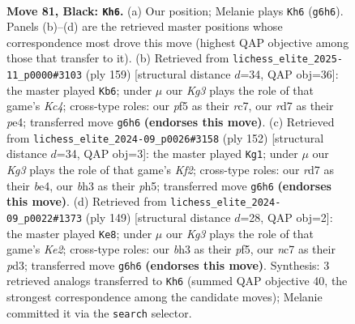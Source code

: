 \documentclass[11pt]{article}
\begin{document}
\clearpage

\begin{figure}[p]\centering
\begin{subfigure}{0.46\textwidth}\centering
\resizebox{\linewidth}{!}{%
\newchessgame
\chessboard[
  setfen={8/PbNR4/6k1/5P2/np6/4K1PB/7P/8 b - - 0 81},
  showmover=false,
  pgfstyle=straightmove, color=movearrow, markmove={g6-h6}
]}
\caption{}
\end{subfigure}\hfill
\begin{subfigure}{0.46\textwidth}\centering
\resizebox{\linewidth}{!}{%
\newchessgame
\chessboard[
  setfen={8/2RP4/5b2/2k5/1p2PB2/pP3K2/8/4r3 b - - 4 80},
  showmover=false,
  pgfstyle=straightmove, color=movearrow, markmove={c5-b6}
]}
\caption{}
\end{subfigure}
\\[4pt]
\begin{subfigure}{0.46\textwidth}\centering
\resizebox{\linewidth}{!}{%
\newchessgame
\chessboard[
  setfen={8/8/R1nbk1p1/7p/4bp1P/8/1B3K2/8 w - - 0 77},
  showmover=false,
  pgfstyle=straightmove, color=movearrow, markmove={f2-g1}
]}
\caption{}
\end{subfigure}\hfill
\begin{subfigure}{0.46\textwidth}\centering
\resizebox{\linewidth}{!}{%
\newchessgame
\chessboard[
  setfen={8/4kbK1/p1p5/5P2/1P6/3P4/2P5/4B3 b - - 4 75},
  showmover=false,
  pgfstyle=straightmove, color=movearrow, markmove={e7-e8}
]}
\caption{}
\end{subfigure}
\caption{\textbf{Move 81, Black: \texttt{Kh6}.} (a) Our position; Melanie plays \texttt{Kh6} (\texttt{g6h6}). Panels (b)--(d) are the retrieved master positions whose correspondence most drove this move (highest QAP objective among those that transfer to it). (b) Retrieved from \texttt{lichess\_elite\_2025-11\_p0000\#3103} (ply 159) [structural distance $d$=34, QAP obj=36]: the master played \texttt{Kb6}; under $\mu$ our \emph{Kg3} plays the role of that game's \emph{Kc4}; cross-type roles: our \emph{p}f5 as their \emph{r}c7, our \emph{r}d7 as their \emph{p}e4; transferred move \texttt{g6h6} \textbf{(endorses this move)}. (c) Retrieved from \texttt{lichess\_elite\_2024-09\_p0026\#3158} (ply 152) [structural distance $d$=34, QAP obj=3]: the master played \texttt{Kg1}; under $\mu$ our \emph{Kg3} plays the role of that game's \emph{Kf2}; cross-type roles: our \emph{r}d7 as their \emph{b}e4, our \emph{b}h3 as their \emph{p}h5; transferred move \texttt{g6h6} \textbf{(endorses this move)}. (d) Retrieved from \texttt{lichess\_elite\_2024-09\_p0022\#1373} (ply 149) [structural distance $d$=28, QAP obj=2]: the master played \texttt{Ke8}; under $\mu$ our \emph{Kg3} plays the role of that game's \emph{Ke2}; cross-type roles: our \emph{b}h3 as their \emph{p}f5, our \emph{n}c7 as their \emph{p}d3; transferred move \texttt{g6h6} \textbf{(endorses this move)}. Synthesis: 3 retrieved analogs transferred to \texttt{Kh6} (summed QAP objective 40, the strongest correspondence among the candidate moves); Melanie committed it via the \texttt{search} selector.}
\label{fig:thought-m161}
\end{figure}
\end{document}

